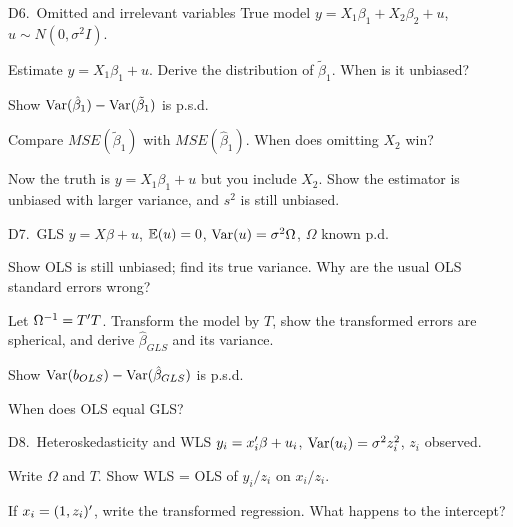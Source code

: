 \documentclass[11pt]{article}
\newcommand{\newtag}{\tcbox[on line, colback=qnavy!60, colframe=qnavy!60, coltext=white,
  boxsep=1pt, left=3pt, right=3pt, top=0pt, bottom=0pt, arc=1.5pt]{\scriptsize\sffamily\bfseries NEW}}
\begin{document}
\begin{qbox}{D6.\ Omitted and irrelevant variables}{\newtag}
True model $y = X_{1}\beta_{1} + X_{2}\beta_{2} + u$, $u \sim N(0,\sigma^{2}I)$.
\begin{flatlist}
  \item[(a)] Estimate $y = X_{1}\beta_{1} + u$. Derive the distribution of $\tilde\beta_{1}$.
        When is it unbiased?
  \item[(b)] Show $\operatorname{Var}(\hat\beta_{1}) - \operatorname{Var}(\tilde\beta_{1})$ is p.s.d.
  \item[(c)] Compare $MSE(\tilde\beta_{1})$ with $MSE(\hat\beta_{1})$. When does omitting $X_{2}$ win?
  \item[(d)] Now the truth is $y = X_{1}\beta_{1} + u$ but you include $X_{2}$.
        Show the estimator is unbiased with larger variance, and $s^{2}$ is still unbiased.
\end{flatlist}
\end{qbox}

\begin{qbox}{D7.\ GLS}{\newtag}
$y = X\beta + u$, $\mathbb{E}(u) = 0$, $\operatorname{Var}(u) = \sigma^{2}\Omega$, $\Omega$ known p.d.
\begin{flatlist}
  \item[(a)] Show OLS is still unbiased; find its true variance. Why are the usual OLS
        standard errors wrong?
  \item[(b)] Let $\Omega^{-1} = T^{\prime} T$. Transform the model by $T$, show the transformed
        errors are spherical, and derive $\hat\beta_{GLS}$ and its variance.
  \item[(c)] Show $\operatorname{Var}(b_{OLS}) - \operatorname{Var}(\hat\beta_{GLS})$ is p.s.d.
  \item[(d)] When does OLS equal GLS?
\end{flatlist}
\end{qbox}

\begin{qbox}{D8.\ Heteroskedasticity and WLS}{\newtag}
$y_{i} = x_{i}^{\prime}\beta + u_{i}$, $\operatorname{Var}(u_{i}) = \sigma^{2}z_{i}^{2}$, $z_{i}$ observed.
\begin{flatlist}
  \item[(a)] Write $\Omega$ and $T$. Show WLS = OLS of $y_{i}/z_{i}$ on $x_{i}/z_{i}$.
  \item[(b)] If $x_{i} = (1, z_{i})^{\prime}$, write the transformed regression. What happens to the intercept?
\end{flatlist}
\end{qbox}
\end{document}

